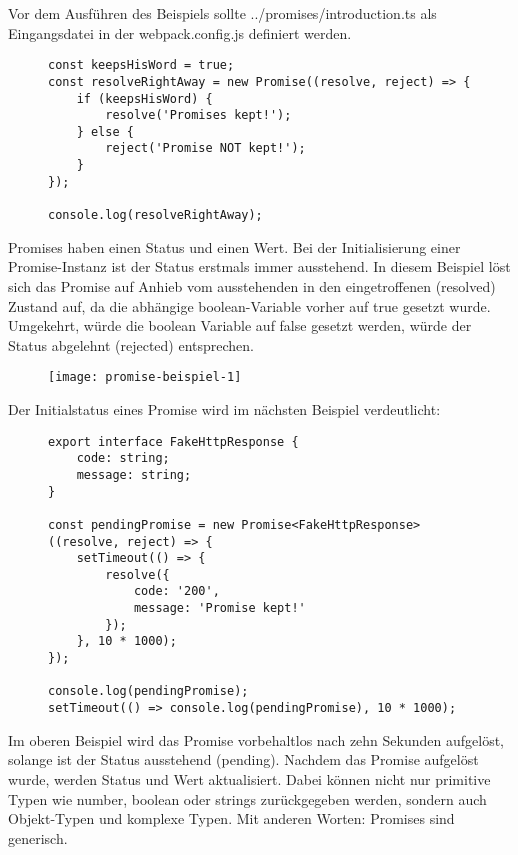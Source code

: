 \noindent
Vor dem Ausführen des Beispiels sollte ../promises/introduction.ts als Eingangsdatei in der webpack.config.js definiert werden.

\begin{figure}[H]
\begin{lstlisting}[basicstyle=\small]
const keepsHisWord = true;
const resolveRightAway = new Promise((resolve, reject) => {
    if (keepsHisWord) {
        resolve('Promises kept!');
    } else {
        reject('Promise NOT kept!');
    }
});

console.log(resolveRightAway);
\end{lstlisting}
\end{figure}

\noindent
Promises haben einen Status und einen Wert. Bei der Initialisierung einer Promise-Instanz ist der Status erstmals immer ausstehend. In diesem Beispiel löst sich das Promise auf Anhieb vom ausstehenden in den eingetroffenen (resolved) Zustand auf, da die abhängige boolean-Variable vorher auf true gesetzt wurde. Umgekehrt, würde die boolean Variable auf false gesetzt werden, würde der Status abgelehnt (rejected) entsprechen.

\begin{figure}[H]
\centering
\texttt{[image: promise-beispiel-1]}
\caption{}
\end{figure}

\noindent
Der Initialstatus eines Promise wird im nächsten Beispiel verdeutlicht:

\begin{figure}[H]
\begin{lstlisting}[basicstyle=\small]
export interface FakeHttpResponse {
    code: string;
    message: string;
}

const pendingPromise = new Promise<FakeHttpResponse>((resolve, reject) => {
    setTimeout(() => {
        resolve({
            code: '200',
            message: 'Promise kept!'
        });
    }, 10 * 1000);
});

console.log(pendingPromise);
setTimeout(() => console.log(pendingPromise), 10 * 1000);
\end{lstlisting}
\end{figure}

\noindent
Im oberen Beispiel wird das Promise vorbehaltlos nach zehn Sekunden aufgelöst, solange ist der Status ausstehend (pending). Nachdem das Promise aufgelöst wurde, werden Status und Wert aktualisiert. Dabei können nicht nur primitive Typen wie number, boolean oder strings zurückgegeben werden, sondern auch Objekt-Typen und komplexe Typen. Mit anderen Worten: Promises sind generisch.

